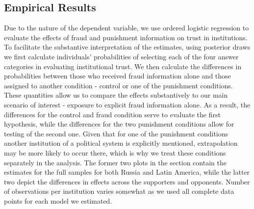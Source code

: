 \documentclass[11pt, ngerman,english,a4]{article}
\begin{document}
\subsection*{Empirical Results}

Due to the nature of the dependent variable, we use ordered logistic regression to evaluate the effects of fraud and punishment information on trust in institutions. To facilitate the substantive interpretation of the estimates, using posterior draws we first calculate individuals' probabilities of selecting each of the four answer categories in evaluating institutional trust. We then calculate the differences in probabilities between those who received fraud information alone and those assigned to another condition - control or one of the punishment conditions. These quantities allow us to compare the effects substantively to our main scenario of interest - exposure to explicit fraud information alone. As a result, the differences for the control and fraud condition serve to evaluate the first hypothesis, while the differences for the two punishment conditions allow for testing of the second one. Given that for one of the punishment conditions another institution of a political system is explicitly mentioned, extrapolation may be more likely to occur there, which is why we treat these conditions separately in the analysis. The former two plots in the section contain the estimates for the full samples for both Russia and Latin America, while the latter two depict the differences in effects across the supporters and opponents. Number of observations per institution varies somewhat as we used all complete data points for each model we estimated. 
\end{document}
